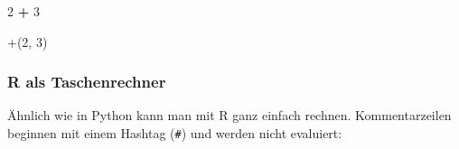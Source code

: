 \documentclass[
]{article}
\newenvironment{Shaded}{\begin{snugshade}}{\end{snugshade}}
\newcommand{\AttributeTok}[1]{\textcolor[rgb]{0.13,0.29,0.53}{#1}}
\newcommand{\DecValTok}[1]{\textcolor[rgb]{0.00,0.00,0.81}{#1}}
\newcommand{\NormalTok}[1]{#1}
\newcommand{\SpecialCharTok}[1]{\textcolor[rgb]{0.81,0.36,0.00}{\textbf{#1}}}
\newcommand{\StringTok}[1]{\textcolor[rgb]{0.31,0.60,0.02}{#1}}
\begin{document}
\begin{Shaded}
\begin{Highlighting}[]
\DecValTok{2} \SpecialCharTok{+} \DecValTok{3}

\StringTok{\textasciigrave{}}\AttributeTok{+}\StringTok{\textasciigrave{}}\NormalTok{(}\DecValTok{2}\NormalTok{, }\DecValTok{3}\NormalTok{)}
\end{Highlighting}
\end{Shaded}

\hypertarget{r-als-taschenrechner}{%
\subsubsection{R als Taschenrechner}\label{r-als-taschenrechner}}

Ähnlich wie in Python kann man mit R ganz einfach rechnen.
Kommentarzeilen beginnen mit einem Hashtag (\texttt{\#}) und werden
nicht evaluiert:
\end{document}
